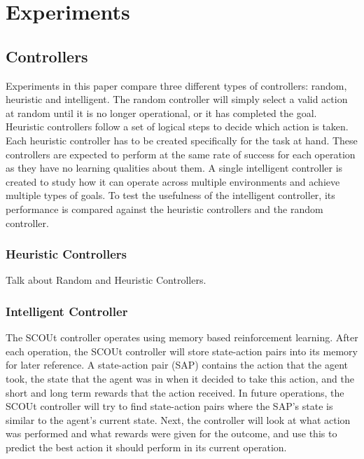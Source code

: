 

\chapter{Experiments}


\section{Controllers} \label{controllers}
Experiments in this paper compare three different types of controllers: random, heuristic and intelligent.
The random controller will simply select a valid action at random until it is no longer operational, or it has completed the goal.
Heuristic controllers follow a set of logical steps to decide which action is taken.
Each heuristic controller has to be created specifically for the task at hand.
These controllers are expected to perform at the same rate of success for each operation as they have no learning qualities about them.
A single intelligent controller is created to study how it can operate across multiple environments and achieve multiple types of goals.
To test the usefulness of the intelligent controller, its performance is compared against the heuristic controllers and the random controller.


\subsection{Heuristic Controllers}
Talk about Random and Heuristic Controllers.


\subsection{Intelligent Controller}
The SCOUt controller operates using memory based reinforcement learning.
After each operation, the SCOUt controller will store state-action pairs into its memory for later reference.
A state-action pair (SAP) contains the action that the agent took, the state that the agent was in when it decided to take this action, and the short and long term rewards that the action received.
In future operations, the SCOUt controller will try to find state-action pairs where the SAP's state is similar to the agent's current state.
Next, the controller will look at what action was performed and what rewards were given for the outcome, and use this to predict the best action it should perform in its current operation.

